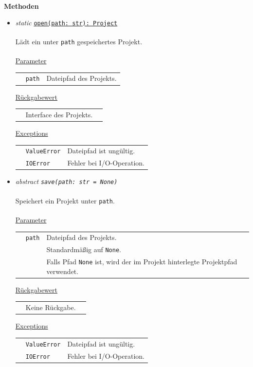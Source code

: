 \documentclass{article}
\begin{document}
\textbf{Methoden}
\begin{itemize}\setlength\itemsep{3em}
\item \textit{\flqq{}static\frqq} \texttt{\underline{open(path: str): Project}}\\\\
Lädt ein unter \texttt{path} gespeichertes Projekt.
\\\\
\underline{Parameter}\\
\begin{tabular}{lll}
 & \texttt{path} & Dateipfad des Projekts.\\
\end{tabular}

\underline{Rückgabewert}\\
\begin{tabular}{lll}
 & Interface des Projekts.\\
\end{tabular}

\underline{Exceptions}\\
\begin{tabular}{lll}
 & \texttt{ValueError} & Dateipfad ist ungültig.\\
 & \texttt{IOError} & Fehler bei I/O-Operation.\\
\end{tabular}


\item \textit{\flqq{}abstract\frqq} \texttt{\textit{save(path: str = None)}}\\\\
Speichert ein Projekt unter \texttt{path}.
\\\\
\underline{Parameter}\\
\begin{tabular}{lll}
 & \texttt{path} & Dateipfad des Projekts.\\
 && Standardmäßig auf \texttt{None}.\\
 && Falls Pfad \texttt{None} ist, wird der im Projekt hinterlegte Projektpfad verwendet.\\
\end{tabular}

\underline{Rückgabewert}\\
\begin{tabular}{lll}
 & Keine Rückgabe.\\
\end{tabular}

\underline{Exceptions}\\
\begin{tabular}{lll}
 & \texttt{ValueError} & Dateipfad ist ungültig.\\
 & \texttt{IOError} & Fehler bei I/O-Operation.\\
\end{tabular}



\end{itemize}
\end{document}
